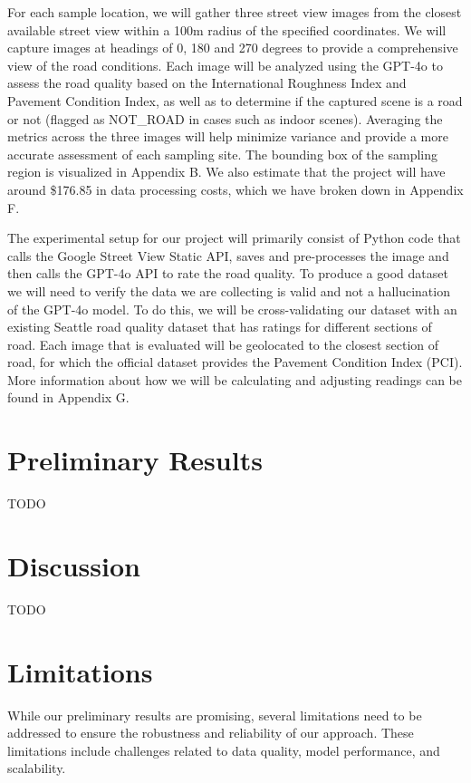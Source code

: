 \documentclass{article}
\begin{document}
For each sample location, we will gather three street view images from the closest available street view within a 100m radius of the specified coordinates. We will capture images at headings of 0, 180 and 270 degrees to provide a comprehensive view of the road conditions. Each image will be analyzed using the GPT-4o to assess the road quality based on the International Roughness Index and Pavement Condition Index, as well as to determine if the captured scene is a road or not (flagged as NOT\_ROAD in cases such as indoor scenes). Averaging the metrics across the three images will help minimize variance and provide a more accurate assessment of each sampling site. The bounding box of the sampling region is visualized in Appendix B. We also estimate that the project will have around \$176.85 in data processing costs, which we have broken down in Appendix F.

The experimental setup for our project will primarily consist of Python code that calls the Google Street View Static API, saves and pre-processes the image and then calls the GPT-4o API to rate the road quality. To produce a good dataset we will need to verify the data we are collecting is valid and not a hallucination of the GPT-4o model. To do this, we will be cross-validating our dataset with an existing Seattle road quality dataset that has ratings for different sections of road. Each image that is evaluated will be geolocated to the closest section of road, for which the official dataset provides the Pavement Condition Index (PCI). More information about how we will be calculating and adjusting readings can be found in Appendix G.


\section{Preliminary Results}

TODO

\section{Discussion}

TODO


\section{Limitations}

While our preliminary results are promising, several limitations need to be addressed to ensure the robustness and reliability of our approach. These limitations include challenges related to data quality, model performance, and scalability.
\end{document}
